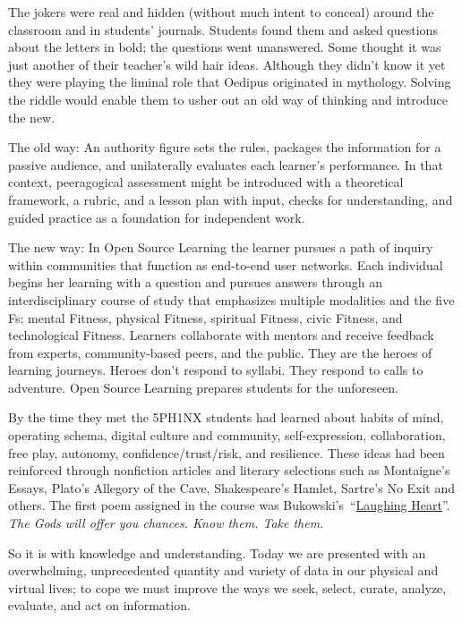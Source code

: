 \noindent The jokers were real and hidden (without much intent to
conceal) around the classroom and in students' journals. Students
found them and asked questions about the letters in bold; the
questions went unanswered. Some thought it was just another of their
teacher's wild hair ideas. Although they didn't know it yet they were
playing the liminal role that Oedipus originated in mythology. Solving
the riddle would enable them to usher out an old way of thinking and
introduce the new. 

The old way: An authority figure sets the rules,
packages the information for a passive audience, and unilaterally
evaluates each learner's performance. In that context, peeragogical
assessment might be introduced with a theoretical framework, a rubric,
and a lesson plan with input, checks for understanding, and guided
practice as a foundation for independent work.

The new way: In Open
Source Learning the learner pursues a path of inquiry within
communities that function as end-to-end user networks. Each individual
begins her learning with a question and pursues answers through an
interdisciplinary course of study that emphasizes multiple modalities
and the five Fs: mental Fitness, physical Fitness, spiritual Fitness,
civic Fitness, and technological Fitness. Learners collaborate with
mentors and receive feedback from experts, community-based peers, and
the public. They are the heroes of learning journeys. Heroes don't
respond to syllabi. They respond to calls to adventure. Open Source
Learning prepares students for the unforeseen.

By the time they met the 5PH1NX students had learned about habits of
mind, operating schema, digital culture and community,
self-expression, collaboration, free play, autonomy,
confidence/trust/risk, and resilience. These ideas had been reinforced
through nonfiction articles and literary selections such as
Montaigne's Essays, Plato's Allegory of the Cave, Shakespeare's
Hamlet, Sartre's No Exit and others. The first poem assigned in the
course was
Bukowski's~``\href{http://www.youtube.com/watch?v=bHOHi5ueo0A}{Laughing
  Heart}''. \emph{The Gods will offer you chances. Know them. Take
  them.} 

So it is with knowledge and understanding. Today we are presented with
an overwhelming, unprecedented quantity and variety of data in our
physical and virtual lives; to cope we must improve the ways we seek,
select, curate, analyze, evaluate, and act on information.

